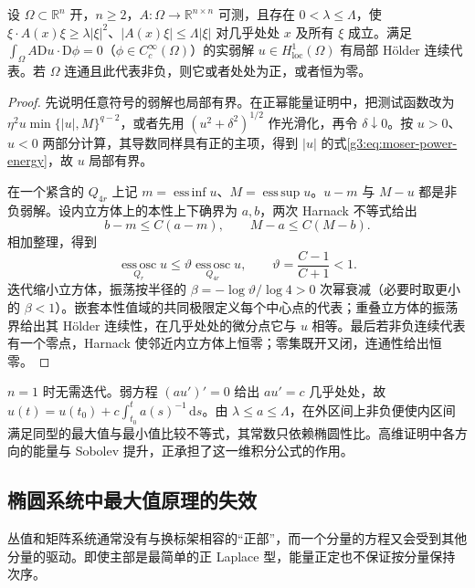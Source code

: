 \begin{corollary}\label{g3:cor:measurable-elliptic-holder}
	设 \(\Omega\subset\mathbb R^n\) 开，\(n\ge2\)，\(A:\Omega\to\mathbb R^{n\times n}\) 可测，且存在 \(0<\lambda\le\Lambda\)，使 \(\xi\cdot A(x)\xi\ge\lambda|\xi|^2\)、\(|A(x)\xi|\le\Lambda|\xi|\) 对几乎处处 \(x\) 及所有 \(\xi\) 成立。满足 \(\int_\Omega A\mathrm Du\cdot\mathrm D\phi=0\)（\(\phi\in C_c^\infty(\Omega)\)）的实弱解 \(u\in H^1_{\mathrm{loc}}(\Omega)\) 有局部 Hölder 连续代表。若 \(\Omega\) 连通且此代表非负，则它或者处处为正，或者恒为零。
\end{corollary}
\begin{proof}
	先说明任意符号的弱解也局部有界。在正幂能量证明中，把测试函数改为 \(\eta^2 u\min\{|u|,M\}^{q-2}\)，或者先用 \((u^2+\delta^2)^{1/2}\) 作光滑化，再令 \(\delta\downarrow0\)。按 \(u>0\)、\(u<0\) 两部分计算，其导数同样具有正的主项，得到 \(|u|\) 的式\eqref{g3:eq:moser-power-energy}，故 \(u\) 局部有界。

	在一个紧含的 \(Q_{4r}\) 上记 \(m=\operatorname*{ess\,inf}u\)、\(M=\operatorname*{ess\,sup}u\)。\(u-m\) 与 \(M-u\) 都是非负弱解。设内立方体上的本性上下确界为 \(a,b\)，两次 Harnack 不等式给出
	\[
		b-m\le C(a-m),\qquad M-a\le C(M-b).
	\]
	相加整理，得到
	\[
		\operatorname*{ess\,osc}_{Q_r}u
		\le\vartheta\operatorname*{ess\,osc}_{Q_{4r}}u,
		\qquad \vartheta=\frac{C-1}{C+1}<1.
	\]
	迭代缩小立方体，振荡按半径的 \(\beta=-\log\vartheta/\log4>0\) 次幂衰减（必要时取更小的 \(\beta<1\)）。嵌套本性值域的共同极限定义每个中心点的代表；重叠立方体的振荡界给出其 Hölder 连续性，在几乎处处的微分点它与 \(u\) 相等。最后若非负连续代表有一个零点，Harnack 使邻近内立方体上恒零；零集既开又闭，连通性给出恒零。
\end{proof}

\(n=1\) 时无需迭代。弱方程 \((a u')'=0\) 给出 \(a u'=c\) 几乎处处，故
\(u(t)=u(t_0)+c\int_{t_0}^t a(s)^{-1}\,\mathrm ds\)。由 \(\lambda\le a\le\Lambda\)，在外区间上非负便使内区间满足同型的最大值与最小值比较不等式，其常数只依赖椭圆性比。高维证明中各方向的能量与 Sobolev 提升，正承担了这一维积分公式的作用。

\subsection{椭圆系统中最大值原理的失效}
\label{g3:subsec:1207:05}
丛值和矩阵系统通常没有与换标架相容的“正部”，而一个分量的方程又会受到其他分量的驱动。即使主部是最简单的正 Laplace 型，能量正定也不保证按分量保持次序。

